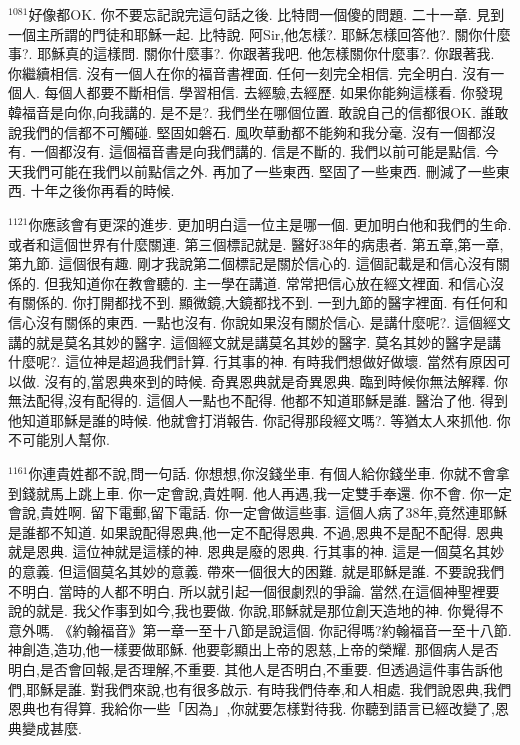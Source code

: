 \documentclass{book}
\begin{document}
$^{1081}$好像都OK.
你不要忘記說完這句話之後.
比特問一個傻的問題.
二十一章.
見到一個主所謂的門徒和耶穌一起.
比特說.
阿Sir,他怎樣?.
耶穌怎樣回答他?.
關你什麼事?.
耶穌真的這樣問.
關你什麼事?.
你跟著我吧.
他怎樣關你什麼事?.
你跟著我.
你繼續相信.
沒有一個人在你的福音書裡面.
任何一刻完全相信.
完全明白.
沒有一個人.
每個人都要不斷相信.
學習相信.
去經驗,去經歷.
如果你能夠這樣看.
你發現韓福音是向你,向我講的.
是不是?.
我們坐在哪個位置.
敢說自己的信都很OK.
誰敢說我們的信都不可觸碰.
堅固如磐石.
風吹草動都不能夠和我分毫.
沒有一個都沒有.
一個都沒有.
這個福音書是向我們講的.
信是不斷的.
我們以前可能是點信.
今天我們可能在我們以前點信之外.
再加了一些東西.
堅固了一些東西.
刪減了一些東西.
十年之後你再看的時候.

$^{1121}$你應該會有更深的進步.
更加明白這一位主是哪一個.
更加明白他和我們的生命.
或者和這個世界有什麼關連.
第三個標記就是.
醫好38年的病患者.
第五章,第一章,第九節.
這個很有趣.
剛才我說第二個標記是關於信心的.
這個記載是和信心沒有關係的.
但我知道你在教會聽的.
主一學在講道.
常常把信心放在經文裡面.
和信心沒有關係的.
你打開都找不到.
顯微鏡,大鏡都找不到.
一到九節的醫字裡面.
有任何和信心沒有關係的東西.
一點也沒有.
你說如果沒有關於信心.
是講什麼呢?.
這個經文講的就是莫名其妙的醫字.
這個經文就是講莫名其妙的醫字.
莫名其妙的醫字是講什麼呢?.
這位神是超過我們計算.
行其事的神.
有時我們想做好做壞.
當然有原因可以做.
沒有的,當恩典來到的時候.
奇異恩典就是奇異恩典.
臨到時候你無法解釋.
你無法配得,沒有配得的.
這個人一點也不配得.
他都不知道耶穌是誰.
醫治了他.
得到他知道耶穌是誰的時候.
他就會打消報告.
你記得那段經文嗎?.
等猶太人來抓他.
你不可能別人幫你.

$^{1161}$你連貴姓都不說,問一句話.
你想想,你沒錢坐車.
有個人給你錢坐車.
你就不會拿到錢就馬上跳上車.
你一定會說,貴姓啊.
他人再遇,我一定雙手奉還.
你不會.
你一定會說,貴姓啊.
留下電郵,留下電話.
你一定會做這些事.
這個人病了38年,竟然連耶穌是誰都不知道.
如果說配得恩典,他一定不配得恩典.
不過,恩典不是配不配得.
恩典就是恩典.
這位神就是這樣的神.
恩典是廢的恩典.
行其事的神.
這是一個莫名其妙的意義.
但這個莫名其妙的意義.
帶來一個很大的困難.
就是耶穌是誰.
不要說我們不明白.
當時的人都不明白.
所以就引起一個很劇烈的爭論.
當然,在這個神聖裡要說的就是.
我父作事到如今,我也要做.
你說,耶穌就是那位創天造地的神.
你覺得不意外嗎.
《約翰福音》第一章一至十八節是說這個.
你記得嗎?約翰福音一至十八節.
神創造,造功,他一樣要做耶穌.
他要彰顯出上帝的恩慈,上帝的榮耀.
那個病人是否明白,是否會回報,是否理解,不重要.
其他人是否明白,不重要.
但透過這件事告訴他們,耶穌是誰.
對我們來說,也有很多啟示.
有時我們侍奉,和人相處.
我們說恩典,我們恩典也有得算.
我給你一些「因為」,你就要怎樣對待我.
你聽到語言已經改變了,恩典變成甚麼.
\end{document}
